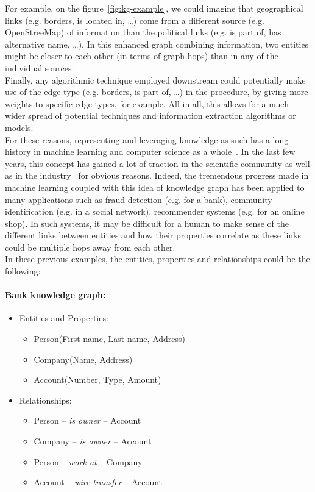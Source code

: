 For example, on the figure~\ref{fig:kg-example}, we could imagine that geographical links (e.g. borders, is located in, \dots) come from a different source (e.g. OpenStreeMap) of information than the political links (e.g. is part of, has alternative name, \dots). In this enhanced graph combining information, two entities might be closer to each other (in terms of graph hops) than in any of the individual sources. \\

Finally, any algorithmic technique employed downstream could potentially make use of the edge type (e.g. borders, is part of, \dots) in the procedure, by giving more weights to specific edge types, for example. All in all, this allows for a much wider spread of potential techniques and information extraction algorithms or models. \\

For these reasons, representing and leveraging knowledge as such has a long history in machine learning and computer science as a whole~\cite{Minsky:1974:FRK:889222, Davis1993WhatIA}. In the last few years, this concept has gained a lot of traction in the scientific community as well as in the industry~\cite{LiuZhiyuan:247, 7358050} for obvious reasons. Indeed, the tremendous progress made in machine learning coupled with this idea of knowledge graph has been applied to many applications such as fraud detection (e.g. for a bank), community identification (e.g. in a social network), recommender systems (e.g. for an online shop). In such systems, it may be difficult for a human to make sense of the different links between entities and how their properties correlate as these links could be multiple hops away from each other. \\

In these previous examples, the entities, properties and relationships could be the following:
\paragraph{Bank knowledge graph: }
\begin{itemize}
 \item[] Entities and Properties:
 \begin{itemize}
  \item Person(First name, Last name, Address)
  \item Company(Name, Address)
  \item Account(Number, Type, Amount)
 \end{itemize}
 \item[] Relationships:
 \begin{itemize}
  \item Person -- \textit{is owner} -- Account
  \item Company -- \textit{is owner} -- Account
  \item Person -- \textit{work at} -- Company
  \item Account -- \textit{wire transfer} -- Account
 \end{itemize}
\end{itemize}

